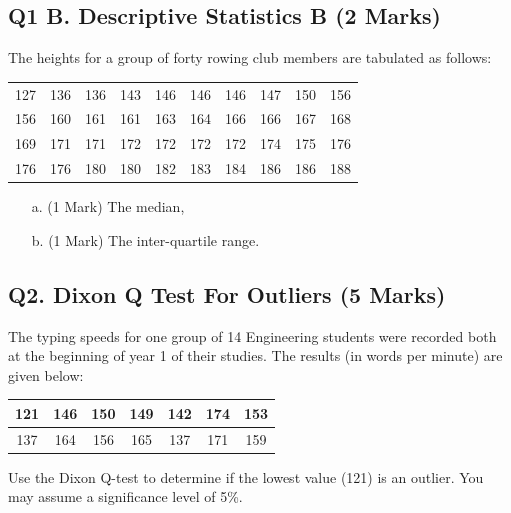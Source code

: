 \documentclass[a4paper,12pt]{article}
\begin{document}
\subsection*{Q1 B. Descriptive Statistics B (2 Marks)} %
The heights for a group of forty rowing club members are tabulated as follows:

\begin{table}[ht]
	\begin{center}
		\begin{tabular}{|rrrrrrrrrr|}
			
			\hline
			127& 136& 136& 143& 146& 146& 146& 147& 150& 156\\
			156& 160& 161& 161& 163& 164& 166& 166& 167& 168\\
			169& 171& 171& 172& 172& 172& 172& 174& 175& 176\\
			176& 176& 180& 180& 182& 183& 184& 186& 186& 188\\
			\hline
		\end{tabular}
	\end{center}
\end{table}
\vspace{-0.5cm}
\begin{itemize}
	\item[a.] (1 Mark) The median,
	\item[b.] (1 Mark) The inter-quartile range.
\end{itemize}

\newpage
\subsection*{Q2. Dixon Q Test For Outliers (5 Marks)}


The typing speeds for one group of 14 Engineering students were recorded both at the beginning of year 1 of their studies. The results (in words per minute) are given below:

\begin{center}
	\begin{tabular}{|c|c|c|c|c|c|c|}
		\hline
		121 & 146 & 150 &149 &142 &174& 153\\ \hline
		137 & 164 & 156& 165& 137& 171& 159
		\\ \hline
	\end{tabular}
\end{center}
Use the Dixon Q-test to determine if the lowest value (121) is an outlier. You may assume a significance level of 5\%.
\end{document}

